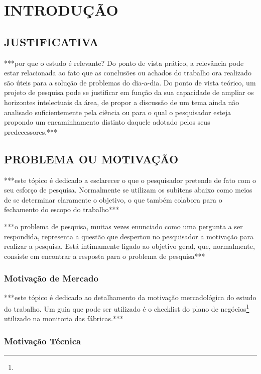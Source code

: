 \section{INTRODUÇÃO}

\subsection{JUSTIFICATIVA}

***por que o estudo é relevante? Do ponto de vista prático, a relevância pode estar relacionada ao fato que as conclusões ou achados do trabalho ora realizado são úteis para a solução de problemas do dia-a-dia. Do ponto de vista teórico, um projeto de pesquisa pode se justificar em função da sua capacidade de ampliar os horizontes intelectuais da área, de propor a discussão de um tema ainda não analisado suficientemente pela ciência ou para o qual o pesquisador esteja propondo um encaminhamento distinto daquele adotado pelos seus predecessores.***

\subsection{PROBLEMA OU MOTIVAÇÃO}

***este tópico é dedicado a esclarecer o que o pesquisador pretende de fato com o seu esforço de pesquisa. Normalmente se utilizam os subitens abaixo como meios de se determinar claramente o objetivo, o que também colabora para o fechamento do escopo do trabalho***

***o problema de pesquisa, muitas vezes enunciado como uma pergunta a ser respondida, representa a questão que despertou no pesquisador a motivação para realizar a pesquisa. Está intimamente ligado ao objetivo geral, que, normalmente, consiste em encontrar a resposta para o problema de pesquisa***

\subsubsection{Motivação de Mercado}

***este tópico é dedicado ao detalhamento da motivação mercadológica do estudo do trabalho. Um guia que pode ser utilizado é o checklist do plano de negócios\footnote{\notaPlanoNegocios} utilizado na monitoria das fábricas.***

\subsubsection{Motivação Técnica}

